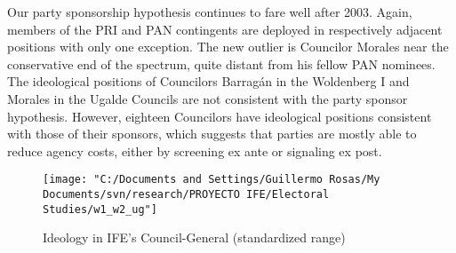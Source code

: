\documentclass[12 pt, letter]{article}
\begin{document}
Our party sponsorship hypothesis continues to fare well after 2003.
Again, members of the PRI and PAN contingents are deployed in
respectively adjacent positions with only one exception.  The new
outlier is Councilor Morales near the conservative end of the
spectrum, quite distant from his fellow PAN nominees. The
ideological positions of Councilors Barrag\'an in the Woldenberg I
and Morales in the Ugalde Councils are not consistent with the party
sponsor hypothesis.  However, eighteen Councilors have ideological
positions consistent with those of their sponsors, which suggests
that parties are mostly able to reduce agency costs, either by
screening ex ante or signaling ex post.

\begin{figure}
\begin{center}
\texttt{[image: "C:/Documents and Settings/Guillermo Rosas/My Documents/svn/research/PROYECTO IFE/Electoral Studies/w1\_w2\_ug"]}
\caption{Ideology in IFE's Council-General (standardized
range)}\label{F:ideolbars}
\end{center}
\end{figure}
\end{document}
